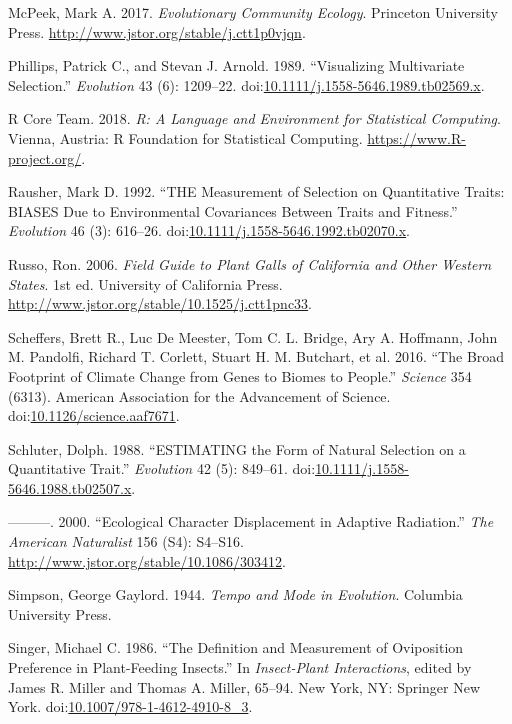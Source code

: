 \documentclass[11pt,]{article}
\begin{document}
\hypertarget{ref-McPeek2017}{}
McPeek, Mark A. 2017. \emph{Evolutionary Community Ecology}. Princeton
University Press. \url{http://www.jstor.org/stable/j.ctt1p0vjqn}.

\hypertarget{ref-Phillips1989}{}
Phillips, Patrick C., and Stevan J. Arnold. 1989. ``Visualizing
Multivariate Selection.'' \emph{Evolution} 43 (6): 1209--22.
doi:\href{https://doi.org/10.1111/j.1558-5646.1989.tb02569.x}{10.1111/j.1558-5646.1989.tb02569.x}.

\hypertarget{ref-R2018}{}
R Core Team. 2018. \emph{R: A Language and Environment for Statistical
Computing}. Vienna, Austria: R Foundation for Statistical Computing.
\url{https://www.R-project.org/}.

\hypertarget{ref-Rausher1992}{}
Rausher, Mark D. 1992. ``THE Measurement of Selection on Quantitative
Traits: BIASES Due to Environmental Covariances Between Traits and
Fitness.'' \emph{Evolution} 46 (3): 616--26.
doi:\href{https://doi.org/10.1111/j.1558-5646.1992.tb02070.x}{10.1111/j.1558-5646.1992.tb02070.x}.

\hypertarget{ref-Russo2006}{}
Russo, Ron. 2006. \emph{Field Guide to Plant Galls of California and
Other Western States}. 1st ed. University of California Press.
\url{http://www.jstor.org/stable/10.1525/j.ctt1pnc33}.

\hypertarget{ref-Scheffers2016}{}
Scheffers, Brett R., Luc De Meester, Tom C. L. Bridge, Ary A. Hoffmann,
John M. Pandolfi, Richard T. Corlett, Stuart H. M. Butchart, et al.
2016. ``The Broad Footprint of Climate Change from Genes to Biomes to
People.'' \emph{Science} 354 (6313). American Association for the
Advancement of Science.
doi:\href{https://doi.org/10.1126/science.aaf7671}{10.1126/science.aaf7671}.

\hypertarget{ref-Schluter1988}{}
Schluter, Dolph. 1988. ``ESTIMATING the Form of Natural Selection on a
Quantitative Trait.'' \emph{Evolution} 42 (5): 849--61.
doi:\href{https://doi.org/10.1111/j.1558-5646.1988.tb02507.x}{10.1111/j.1558-5646.1988.tb02507.x}.

\hypertarget{ref-Schluter2000}{}
---------. 2000. ``Ecological Character Displacement in Adaptive
Radiation.'' \emph{The American Naturalist} 156 (S4): S4--S16.
\url{http://www.jstor.org/stable/10.1086/303412}.

\hypertarget{ref-Simpson1944}{}
Simpson, George Gaylord. 1944. \emph{Tempo and Mode in Evolution}.
Columbia University Press.

\hypertarget{ref-Singer1986}{}
Singer, Michael C. 1986. ``The Definition and Measurement of Oviposition
Preference in Plant-Feeding Insects.'' In \emph{Insect-Plant
Interactions}, edited by James R. Miller and Thomas A. Miller, 65--94.
New York, NY: Springer New York.
doi:\href{https://doi.org/10.1007/978-1-4612-4910-8_3}{10.1007/978-1-4612-4910-8\_3}.
\end{document}
